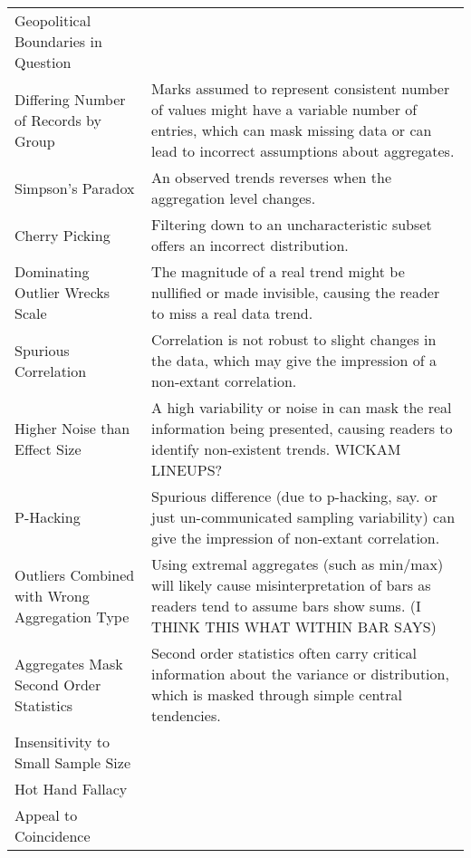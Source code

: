 \begin{longtable}{p{5cm}p{12cm}}
   \rowcolor{colorb}Geopolitical Boundaries in Question &  \\
 \rowcolor{colorb-opaque}Differing Number of Records by Group & Marks assumed to represent consistent number of values might have a variable number of entries, which can mask missing data or can lead to incorrect assumptions about aggregates. \\
 \rowcolor{colorb}Simpson's Paradox & An observed trends reverses when the aggregation level changes. \cite{guo2017you}\\
 \rowcolor{colorb-opaque}Cherry Picking & Filtering down to an uncharacteristic subset offers an incorrect distribution. \cite{few2019loom}\\
 \rowcolor{colorb}Dominating Outlier Wrecks Scale & The magnitude of a real trend might be nullified or made invisible, causing the reader to miss a real data trend.  \cite{kindlmann2014algebraic}\\
 \rowcolor{colorb-opaque}Spurious Correlation & Correlation is not robust to slight changes in the data, which may give the impression of a non-extant correlation. \\
 \rowcolor{colorb}Higher Noise than Effect Size & A high variability or noise in can mask the real information being presented, causing readers to identify non-existent trends. WICKAM LINEUPS?\\
 \rowcolor{colorb-opaque}P-Hacking & Spurious difference (due to p-hacking, say. or just un-communicated sampling variability) can give the impression of non-extant correlation. \cite{pu2018garden}\\
 \rowcolor{colorb}Outliers Combined with Wrong Aggregation Type & Using extremal aggregates (such as min/max) will likely cause misinterpretation of bars as readers tend to assume bars show sums. (I THINK THIS WHAT WITHIN BAR SAYS) \cite{newman2012bar}\\
 \rowcolor{colorb-opaque}Aggregates Mask Second Order Statistics & Second order statistics often carry critical information about the variance or distribution, which is masked through simple central tendencies.  \cite{wall2017warning, few2019loom, matejka2017same, anscombe1973graphs}\\
 \rowcolor{colorb}Insensitivity to Small Sample Size &  \cite{few2019loom}\\
 \rowcolor{colorb-opaque}Hot Hand Fallacy &  \cite{few2019loom}\\
 \rowcolor{colorb}Appeal to Coincidence &  \cite{few2019loom}\\

\end{longtable}
